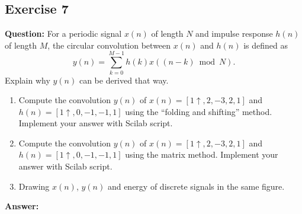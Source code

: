 \documentclass[12pt,a4paper]{article}
\begin{document}
\subsection{Exercise 7}\label{sec:ex7}
\noindent\textbf{Question:}
For a periodic signal $x(n)$ of length $N$ and impulse response $h(n)$ of length $M$, the circular convolution between $x(n)$ and $h(n)$ is defined as
\[
y(n) = \sum_{k=0}^{M-1} h(k) x((n - k) \bmod N).
\]
Explain why $y(n)$ can be derived that way.
\begin{enumerate}
    \item Compute the convolution $y(n)$ of $x(n) = [1 \uparrow, 2, -3, 2, 1]$ and $h(n) = [1 \uparrow, 0, -1, -1, 1]$ using the ``folding and shifting'' method. Implement your answer with Scilab script.
    \item Compute the convolution $y(n)$ of $x(n) = [1 \uparrow, 2, -3, 2, 1]$ and $h(n) = [1 \uparrow, 0, -1, -1, 1]$ using the matrix method. Implement your answer with Scilab script.
    \item Drawing $x(n)$, $y(n)$ and energy of discrete signals in the same figure.
\end{enumerate}

\noindent\textbf{Answer:}
\end{document}
